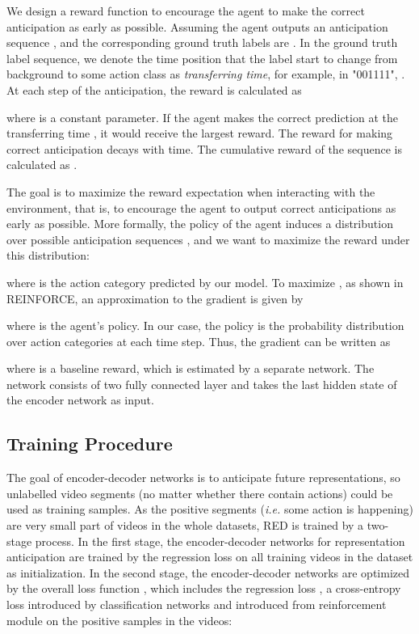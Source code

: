 \documentclass{bmvc2k}
\begin{document}
We design a reward function to encourage the agent to make the correct anticipation as early as possible. Assuming the agent outputs an anticipation sequence , and the corresponding ground truth labels are . In the ground truth label sequence, we denote the time position  that the label start to change from background to some action class as \emph{transferring time}, for example, in "001111", . At each step  of the anticipation, the reward  is calculated as 

where  is a constant parameter. If the agent makes the correct prediction at the transferring time , it would receive the largest reward. The reward for making correct anticipation decays with time. The cumulative reward of the sequence is calculated as .


The goal is to maximize the reward expectation  when interacting with the environment, that is, to encourage the agent to output correct anticipations as early as possible. More formally, the policy of the agent induces a distribution over possible anticipation sequences , and we want to maximize the reward under this distribution:


where  is the action category predicted by our model. To maximize , as shown in REINFORCE\cite{williams1992simple}, an approximation to the gradient is given by 

where  is the agent's policy. In our case, the policy  is the probability distribution over action categories at each time step. Thus, the gradient can be written as

where  is a baseline reward, which is estimated by a separate network. The network consists of two fully connected layer and takes the last hidden state of the encoder network as input. 

\subsection{Training Procedure}

The goal of encoder-decoder networks is to anticipate future representations, so unlabelled video segments (no matter whether there contain actions) could be used as training samples. As the positive segments (\emph{i.e.} some action is happening) are very small part of videos in the whole datasets, RED is trained by a two-stage process. In the first stage, the encoder-decoder networks for representation anticipation are trained by the regression loss  on all training videos in the dataset as initialization. In the second stage, the encoder-decoder networks are optimized by the overall loss function , which includes the regression loss , a cross-entropy loss  introduced by classification networks and  introduced from reinforcement module on the positive samples in the videos: 
\end{document}
